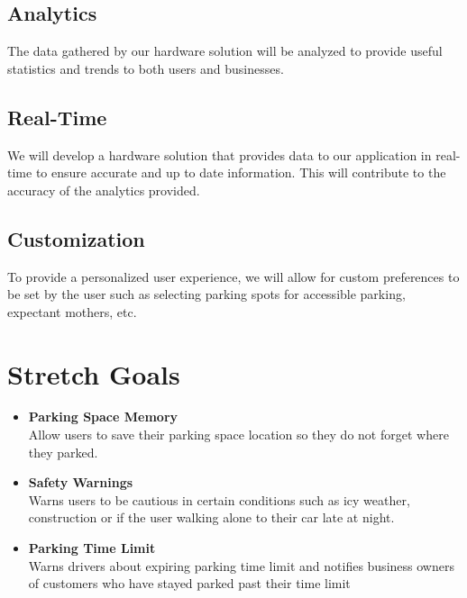 \documentclass[]{article}
\begin{document}
\subsection{Analytics}
The data gathered by our hardware solution will be analyzed to provide useful statistics and trends to both users and businesses.

\subsection{Real-Time}
We will develop a hardware solution that provides data to our application in real-time to ensure accurate and up to date information. This will contribute to the accuracy of the analytics provided.

\subsection{Customization}
To provide a personalized user experience, we will allow for custom preferences to be set by the user such as selecting parking spots for accessible parking, expectant mothers, etc.

\section{Stretch Goals}
\begin{itemize}
	\item \textbf{Parking Space Memory}\\Allow users to save their parking space location so they do not forget where they parked.
	\item \textbf{Safety Warnings}\\Warns users to be cautious in certain conditions such as icy weather, construction or if the user walking alone to their car late at night.
	\item \textbf{Parking Time Limit}\\Warns drivers about expiring parking time limit and notifies business owners of customers who have stayed parked past their time limit
\end{itemize}
\end{document}
